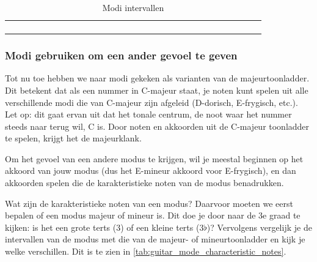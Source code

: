 \begin{table}[h]
\begin{NiceTabular}{*{30}{c}}
		\hline \\
		 &  & & & & & & & & & & & & &  & &  & &  & &  & &  & &  & &  & & \\
		\Block{}{} &  & & & & & & & & & & & &  & &  & &  & &  & &  & &  & &  & & \\
		\Block{}{} &  & & & & & & & & & & & &   & &  & &  & &  & &  & &  & &  & & \\
	\end{NiceTabular}
	\caption{Modi intervallen}
	\label{tab:guitar_mode_intervals}
\end{table}

\newpage

\subsubsection{Modi gebruiken om een ander gevoel te geven}

Tot nu toe hebben we naar modi gekeken als varianten van de majeurtoonladder. Dit betekent dat als een nummer in C-majeur staat, je noten kunt spelen uit alle verschillende modi die van C-majeur zijn afgeleid (D-dorisch, E-frygisch, etc.). Let op: dit gaat ervan uit dat het tonale centrum, de noot waar het nummer steeds naar terug wil, C is. Door noten en akkoorden uit de C-majeur toonladder te spelen, krijgt het de majeurklank.

Om het gevoel van een andere modus te krijgen, wil je meestal beginnen op het akkoord van jouw modus (dus het E-mineur akkoord voor E-frygisch), en dan akkoorden spelen die de karakteristieke noten van de modus benadrukken.

Wat zijn de karakteristieke noten van een modus? Daarvoor moeten we eerst bepalen of een modus majeur of mineur is. Dit doe je door naar de 3e graad te kijken: is het een grote terts (3) of een kleine terts (3$\flat$)? Vervolgens vergelijk je de intervallen van de modus met die van de majeur- of mineurtoonladder en kijk je welke verschillen. Dit is te zien in \autoref{tab:guitar_mode_characteristic_notes}.

